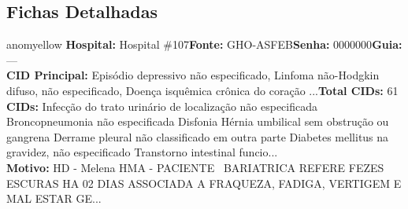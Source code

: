 \documentclass[a4paper,10pt]{article}
\begin{document}
\subsection{Fichas Detalhadas}
\begin{anomalycard}[Interna\c{c}\~{a}o \#730 | Pac. \#889 | MODERADO (z=2.59) | LOS: 7d | 06/03/2026\,$\to$\,13/03/2026]{anomyellow}
\textbf{Hospital:} Hospital \#107\quad \textbf{Fonte:} GHO-ASFEB\quad \textbf{Senha:} 0000000\quad \textbf{Guia:} ---\\

\textbf{CID Principal:} {\small Episódio depressivo não especificado, Linfoma não-Hodgkin difuso, não especificado, Doença isquêmica crônica do coração ...}\quad\textbf{Total CIDs:} 61\\

\textbf{CIDs:} {\scriptsize Infecção do trato urinário de localização não especificada \textbar{} Broncopneumonia não especificada \textbar{} Disfonia \textbar{} Hérnia umbilical sem obstrução ou gangrena \textbar{} Derrame pleural não classificado em outra parte \textbar{} Diabetes mellitus na gravidez, não especificado \textbar{} Transtorno intestinal funcio...}\\

\textbf{Motivo:} {\scriptsize HD -  Melena   HMA -  PACIENTE  BARIATRICA REFERE FEZES ESCURAS HA 02 DIAS ASSOCIADA A FRAQUEZA, FADIGA, VERTIGEM E MAL ESTAR GE...}\\

\end{anomalycard}
\end{document}
